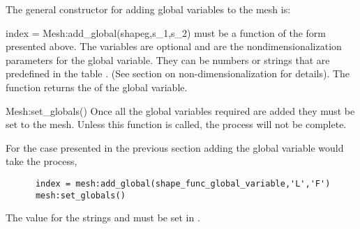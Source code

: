 The general constructor for adding global variables to the
mesh is:
\begin{codelist}

  \item[index = Mesh:add\_global(shapeg,s\_1,s\_2)]
   must be a function of the form presented above.
  The variables  are optional and are the nondimensionalization
  parameters for the global variable. They can be numbers or strings
  that are predefined in the table . (See section on
  non-dimensionalization for details). The function returns the 
  of the global variable.

  \item[{Mesh:set\_globals()}]
  Once all the global variables required are added they must be 
  set to the mesh. Unless this function is called, the process will
  not be complete.

\end{codelist}
For the case presented in the previous section adding the global 
variable would take the process,
\begin{verbatim}
      index = mesh:add_global(shape_func_global_variable,'L','F')
      mesh:set_globals()
\end{verbatim}
The value for the strings  and  must be set
in .


